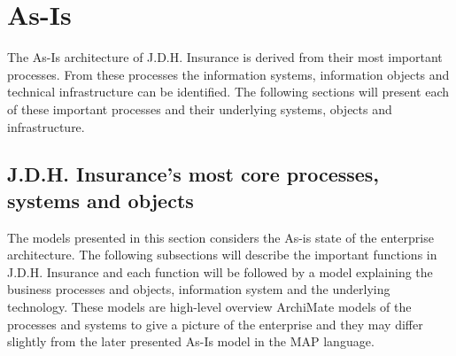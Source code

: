 \section{As-Is}
\label{sec:as_is}
The As-Is architecture of J.D.H. Insurance is derived from their most important processes. From these processes the information systems, information objects and technical infrastructure can be identified. The following sections will present each of these important processes and their underlying systems, objects and infrastructure.
\subsection{J.D.H. Insurance's most core processes, systems and objects}
\label{sec:coreShit}
The models presented in this section considers the As-is state of the enterprise architecture. The following subsections will describe the important functions in J.D.H. Insurance and each function will be followed by a model explaining the business processes and objects, information system and the underlying technology. These models are high-level overview ArchiMate models of the processes and systems to give a picture of the enterprise and they may differ slightly from the later presented As-Is model in the MAP language.
